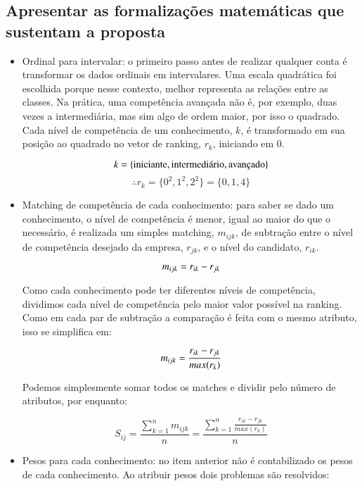 \documentclass[preprint,12pt]{elsarticle}
\begin{document}
\subsection{Apresentar as formalizações matemáticas que sustentam a proposta}
\begin{itemize}
    \item Ordinal para intervalar: o primeiro passo antes de realizar qualquer conta é transformar os dados ordinais em intervalares. Uma escala quadrática foi escolhida porque nesse contexto, melhor representa as relações entre as classes. Na prática, uma competência avançada não é, por exemplo, duas vezes a intermediária, mas sim algo de ordem maior, por isso o quadrado. Cada nível de competência de um conhecimento, $k$, é transformado em sua posição ao quadrado no vetor de ranking, $r_k$, iniciando em 0.
    
    $$\\k = \{ \text{iniciante}, \text{intermediário}, \text{avançado} \}$$ 
    $$ \therefore r_k = \{ 0^2, 1^2, 2^2 \} = \{ 0, 1, 4 \} $$
    
    \item Matching de competência de cada conhecimento: para saber se dado um conhecimento, o nível de competência é menor, igual ao maior do que o necessário, é realizada um simples matching, $m_{ijk}$, de subtração entre o nível de competência desejado da empresa, $r_{jk}$, e o nível do candidato, $r_{ik}$.
    
    $$\\ m_{ijk} = r_{ik} - r_{jk} $$
    
    Como cada conhecimento pode ter diferentes níveis de competência, dividimos cada nível de competência pelo maior valor possível na ranking. Como em cada par de subtração a comparação é feita com o mesmo atributo, isso se simplifica em:
    
    $$\\ m_{ijk} = \frac{r_{ik} - r_{jk}}{max(r_k)} $$
    
    Podemos simplesmente somar todos os matches e dividir pelo número de atributos, por enquanto:
      
    \begin{equation}
    S_{ij} =  \frac{\sum_{k=1}^n m_{ijk}}
                  {n} = 
              \frac{\sum_{k=1}^n \frac{r_{ik} - r_{jk}}{max(r_k)}}
                  {n}
    \end{equation}
    
    \item Pesos para cada conhecimento: no item anterior não é contabilizado os pesos de cada conhecimento. Ao atribuir pesos dois problemas são resolvidos:
    

\end{itemize}
\end{document}
